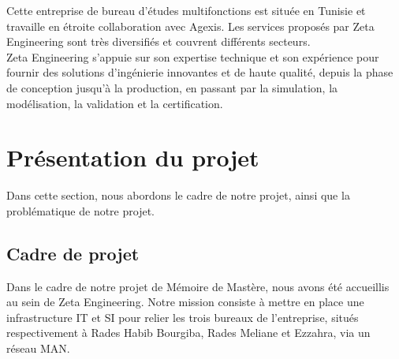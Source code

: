 Cette entreprise de bureau d'études multifonctions est située en Tunisie et travaille en étroite collaboration avec Agexis. Les services proposés par Zeta Engineering sont très diversifiés et couvrent différents secteurs. \\

Zeta Engineering s'appuie sur son expertise technique et son expérience pour fournir des solutions d'ingénierie innovantes et de haute qualité, depuis la phase de conception jusqu'à la production, en passant par la simulation, la modélisation, la validation et la certification.  \\





\section{Présentation du projet}

Dans cette section, nous abordons le cadre de notre projet, ainsi que la problématique de notre projet.


\subsection{Cadre de projet}
Dans le cadre de notre projet de Mémoire de Mastère, nous avons été accueillis au sein de Zeta Engineering. Notre mission consiste à mettre en place une infrastructure IT et SI pour relier les trois bureaux de l'entreprise, situés respectivement à Rades Habib Bourgiba, Rades Meliane et Ezzahra, via un réseau MAN.\\


